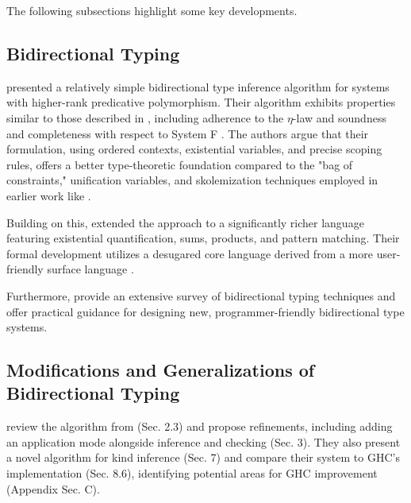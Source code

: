 The following subsections highlight some key developments.

\subsection{Bidirectional Typing}

\citeauthor{dunfield-complete-2013} \cite{dunfield-complete-2013} presented a relatively simple bidirectional type inference algorithm for systems with higher-rank predicative polymorphism. Their algorithm exhibits properties similar \cite[Fig. 15]{dunfield-complete-2013} to those described in \cite[Sec.~6]{jones-practical-2007}, including adherence to the $\eta$-law \cite[Ch.~4]{selinger-lecture-2013} and soundness and completeness with respect to System F \cite[Ch.~8]{selinger-lecture-2013}. The authors argue that their formulation, using ordered contexts, existential variables, and precise scoping rules, offers a better type-theoretic foundation compared to the "bag of constraints," unification variables, and skolemization techniques employed in earlier work like \cite{jones-practical-2007}.

Building on this, \citeauthor{dunfield-sound-2019} \cite{dunfield-sound-2019} extended the approach to a significantly richer language featuring existential quantification, sums, products, and pattern matching. Their formal development utilizes a desugared core language \cite[Fig. 11]{dunfield-sound-2019} derived from a more user-friendly surface language \cite[Fig. 1]{dunfield-sound-2019}.

Furthermore, \citeauthor{dunfield-bidirectional-2020} \cite{dunfield-bidirectional-2020} provide an extensive survey of bidirectional typing techniques and offer practical guidance for designing new, programmer-friendly bidirectional type systems.

\subsection{Modifications and Generalizations of Bidirectional Typing}

\citeauthor{xie-higher-rank} \cite{xie-higher-rank} review the algorithm from \cite{dunfield-complete-2013} (Sec. 2.3) and propose refinements, including adding an application mode alongside inference and checking (Sec. 3). They also present a novel algorithm for kind inference (Sec. 7) and compare their system to GHC's implementation (Sec. 8.6), identifying potential areas for GHC improvement (Appendix Sec. C).

